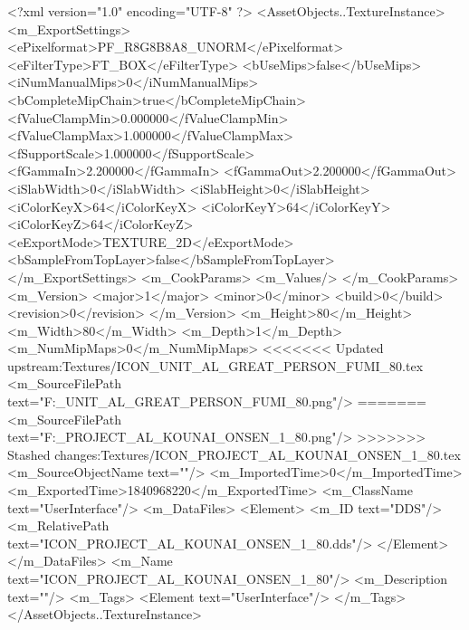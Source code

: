 <?xml version="1.0" encoding="UTF-8" ?>
<AssetObjects..TextureInstance>
	<m_ExportSettings>
		<ePixelformat>PF_R8G8B8A8_UNORM</ePixelformat>
		<eFilterType>FT_BOX</eFilterType>
		<bUseMips>false</bUseMips>
		<iNumManualMips>0</iNumManualMips>
		<bCompleteMipChain>true</bCompleteMipChain>
		<fValueClampMin>0.000000</fValueClampMin>
		<fValueClampMax>1.000000</fValueClampMax>
		<fSupportScale>1.000000</fSupportScale>
		<fGammaIn>2.200000</fGammaIn>
		<fGammaOut>2.200000</fGammaOut>
		<iSlabWidth>0</iSlabWidth>
		<iSlabHeight>0</iSlabHeight>
		<iColorKeyX>64</iColorKeyX>
		<iColorKeyY>64</iColorKeyY>
		<iColorKeyZ>64</iColorKeyZ>
		<eExportMode>TEXTURE_2D</eExportMode>
		<bSampleFromTopLayer>false</bSampleFromTopLayer>
	</m_ExportSettings>
	<m_CookParams>
		<m_Values/>
	</m_CookParams>
	<m_Version>
		<major>1</major>
		<minor>0</minor>
		<build>0</build>
		<revision>0</revision>
	</m_Version>
	<m_Height>80</m_Height>
	<m_Width>80</m_Width>
	<m_Depth>1</m_Depth>
	<m_NumMipMaps>0</m_NumMipMaps>
<<<<<<< Updated upstream:Textures/ICON_UNIT_AL_GREAT_PERSON_FUMI_80.tex
	<m_SourceFilePath text="F:\DT\lilyimages\gpportrait\ICON_UNIT_AL_GREAT_PERSON_FUMI_80.png"/>
=======
	<m_SourceFilePath text="F:\DT\lilyimages\projects\ICON_PROJECT_AL_KOUNAI_ONSEN_1_80.png"/>
>>>>>>> Stashed changes:Textures/ICON_PROJECT_AL_KOUNAI_ONSEN_1_80.tex
	<m_SourceObjectName text=""/>
	<m_ImportedTime>0</m_ImportedTime>
	<m_ExportedTime>1840968220</m_ExportedTime>
	<m_ClassName text="UserInterface"/>
	<m_DataFiles>
		<Element>
			<m_ID text="DDS"/>
			<m_RelativePath text="ICON_PROJECT_AL_KOUNAI_ONSEN_1_80.dds"/>
		</Element>
	</m_DataFiles>
	<m_Name text="ICON_PROJECT_AL_KOUNAI_ONSEN_1_80"/>
	<m_Description text=""/>
	<m_Tags>
		<Element text="UserInterface"/>
	</m_Tags>
</AssetObjects..TextureInstance>

